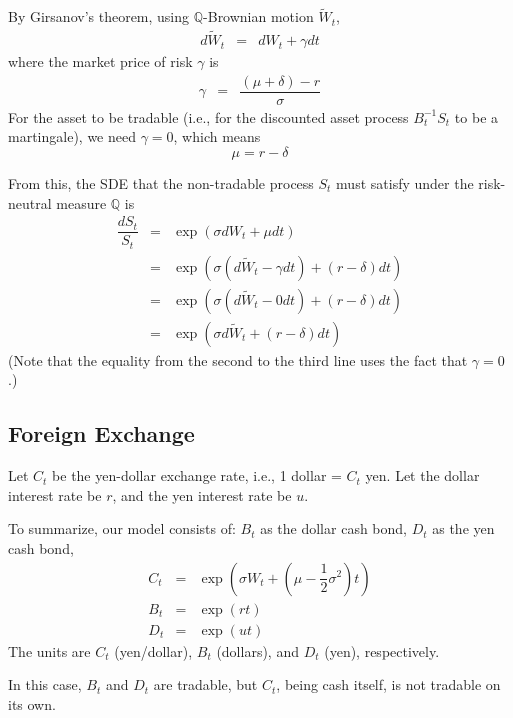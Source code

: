 \documentclass[uplatex,a4j,12pt,dvipdfmx]{jsarticle}
\begin{document}
By Girsanov's theorem, using $\mathbb{Q}$-Brownian motion $\tilde{W}_{t}$,
%
%
\begin{eqnarray*}
	d \tilde{W}_{t}
	&=&
	d W_{t} + \gamma dt
\end{eqnarray*}
%
%
where the market price of risk $\gamma$ is
%
%
\begin{eqnarray*}
	\gamma
	&=&
	\dfrac{(\mu + \delta) - r}{\sigma}
\end{eqnarray*}
%
%
For the asset to be tradable (i.e., for the discounted asset process $B^{-1}_{t} S_{t}$ to be a martingale), we need $\gamma=0$, which means
$$
	\mu = r - \delta
$$

From this, the SDE that the non-tradable process $S_{t}$ must satisfy under the risk-neutral measure $\mathbb{Q}$ is
%
%
\begin{eqnarray*}
	\dfrac{dS_{t}}{S_{t}}
	&=&
	\exp \left( \sigma dW_{t} + \mu dt \right)
	\\ &=&
	\exp \left( \sigma ( d \tilde{W}_{t} - \gamma dt ) + (r - \delta) dt \right)
	\\ &=&
	\exp \left( \sigma ( d \tilde{W}_{t} - 0 dt ) + (r - \delta) dt \right)
	\\ &=&
	\exp \left( \sigma d \tilde{W}_{t} + (r - \delta) dt \right)
\end{eqnarray*}
%
%
(Note that the equality from the second to the third line uses the fact that $\gamma=0$.)

\subsection{Foreign Exchange}

Let $C_{t}$ be the yen-dollar exchange rate, i.e., 1 dollar = $C_{t}$ yen.
Let the dollar interest rate be $r$, and the yen interest rate be $u$.

To summarize, our model consists of:
$B_{t}$ as the dollar cash bond,
$D_{t}$ as the yen cash bond,
%
%
\begin{eqnarray*}
	C_{t}
	&=&
	\exp \left( \sigma W_{t} + \left( \mu - \dfrac{1}{2} \sigma^{2} \right) t \right)
	\\
	B_{t}
	&=&
	\exp (rt)
	\\
	D_{t}
	&=&
	\exp (ut)
\end{eqnarray*}
%
%
The units are $C_{t}$ (yen/dollar), $B_{t}$ (dollars), and $D_{t}$ (yen), respectively.

In this case, $B_{t}$ and $D_{t}$ are tradable, but $C_{t}$, being cash itself, is not tradable on its own.
\end{document}
